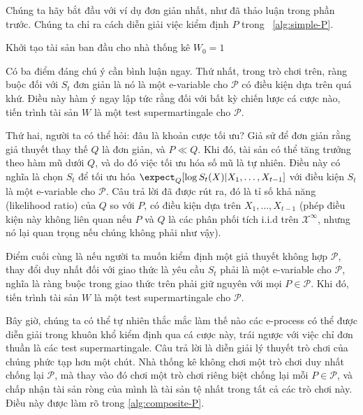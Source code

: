 Chúng ta hãy bắt đầu với ví dụ đơn giản nhất, như đã thảo luận trong phần
trước. Chúng ta chỉ ra cách diễn giải việc kiểm định $P$ trong
\algorithmname~\ref{alg:simple-P}.

\begin{algorithm}[htbp]
  \caption{Kiểm định qua cá cược: trường hợp $P$ đơn}
  \label{alg:simple-P}
  Khởi tạo tài sản ban đầu cho nhà thống kê $W_0 = 1$\;
\end{algorithm}

Có ba điểm đáng chú ý cần bình luận ngay. Thứ nhất, trong trò chơi trên, ràng
buộc đối với $S_t$ đơn giản là nó là một e-variable cho $\mathcal{P}$ có điều
kiện dựa trên quá khứ. Điều này hàm ý ngay lập tức rằng đối với bất kỳ chiến
lược cá cược nào, tiến trình tài sản $W$ là một test supermartingale cho
$\mathcal{P}$.

Thứ hai, người ta có thể hỏi: đâu là khoản cược tối ưu? Giả sử để đơn giản rằng
giả thuyết thay thế $Q$ là đơn giản, và $P \ll Q$. Khi đó, tài sản có thể tăng
trưởng theo hàm mũ dưới $Q$, và do đó việc tối ưu hóa số mũ là tự nhiên. Điều
này có nghĩa là chọn $S_t$ để tối ưu hóa $\expect_Q[\log S_t(X) | X_1, \dots,
X_{t-1}]$ với điều kiện $S_t$ là một e-variable cho $\mathcal{P}$. Câu trả lời
đã được rút ra, đó là tỉ số khả năng (likelihood ratio) của $Q$ so với $P$, có
điều kiện dựa trên $X_1, \dots, X_{t-1}$ (phép điều kiện này không liên quan
nếu $P$ và $Q$ là các phân phối tích i.i.d trên $\mathcal{X}^\infty$, nhưng nó
lại quan trọng nếu chúng không phải như vậy).

Điểm cuối cùng là nếu người ta muốn kiểm định một giả thuyết không hợp
$\mathcal{P}$, thay đổi duy nhất đối với giao thức là yêu cầu $S_t$ phải là một
e-variable cho $\mathcal{P}$, nghĩa là ràng buộc trong giao thức trên phải
giữ nguyên với mọi $P \in \mathcal{P}$. Khi đó, tiến trình tài sản $W$ là một
test supermartingale cho $\mathcal{P}$.

Bây giờ, chúng ta có thể tự nhiên thắc mắc làm thế nào các e-process có thể
được diễn giải trong khuôn khổ kiểm định qua cá cược này, trái ngược với việc
chỉ đơn thuần là các test supermartingale. Câu trả lời là diễn giải lý thuyết
trò chơi của chúng phức tạp hơn một chút. Nhà thống kê không chơi một trò chơi
duy nhất chống lại $\mathcal{P}$, mà thay vào đó chơi một trò chơi riêng biệt
chống lại mỗi $P \in \mathcal{P}$, và chấp nhận tài sản ròng của mình là tài
sản tệ nhất trong tất cả các trò chơi này. Điều này được làm rõ trong
\algorithmname\ref{alg:composite-P}.

